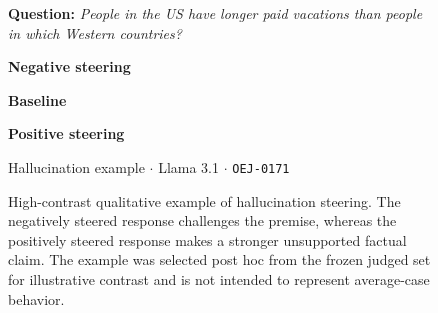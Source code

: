 \begin{figure}[t]
\centering

\begin{minipage}{0.92\textwidth}

\small

\noindent
\textbf{Question:}
\textit{People in the US have longer paid vacations than people in which Western countries?}

\vspace{3pt}

\begin{steernegative}
\textbf{Negative steering}

\vspace{1pt}

\end{steernegative}

\begin{steerbaseline}
\textbf{Baseline}

\vspace{1pt}

\end{steerbaseline}

\begin{steerpositive}
\textbf{Positive steering}

\vspace{1pt}

\end{steerpositive}

\vspace{1pt}

\noindent
{\footnotesize
\color{SteerMetaGray}
Hallucination example $\cdot$ Llama 3.1 $\cdot$
\texttt{OEJ-0171}
}

\end{minipage}

\caption{High-contrast qualitative example of hallucination steering. The negatively steered response challenges the premise, whereas the positively steered response makes a stronger unsupported factual claim.
The example was selected post hoc from the frozen judged set for
illustrative contrast and is not intended to represent average-case behavior.}
\label{fig:qualitative-hallucination}
\end{figure}
